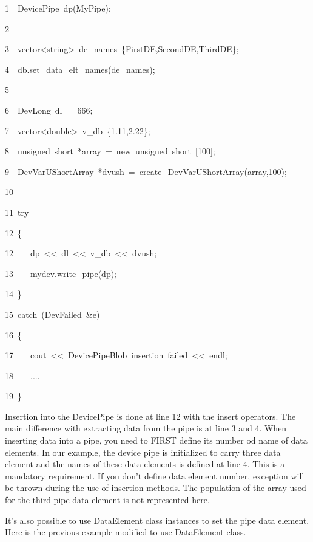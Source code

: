 
\begin{lyxcode}
1~~DevicePipe~dp(\textquotedbl{}MyPipe\textquotedbl{});

2~

3~~vector<string>~de\_names~\{\textquotedbl{}FirstDE\textquotedbl{},\textquotedbl{}SecondDE\textquotedbl{},\textquotedbl{}ThirdDE\textquotedbl{}\};

4~~db.set\_data\_elt\_names(de\_names);

5

6~~DevLong~dl~=~666;~~

7~~vector<double>~v\_db~\{1.11,2.22\};

8~~unsigned~short~{*}array~=~new~unsigned~short~{[}100{]};

9~~DevVarUShortArray~{*}dvush~=~create\_DevVarUShortArray(array,100);

10

11~try~~

12~\{~~~~~

12~~~~dp~<\textcompwordmark{}<~dl~<\textcompwordmark{}<~v\_db~<\textcompwordmark{}<~dvush;

13~~~~mydev.write\_pipe(dp);

14~\}

15~catch~(DevFailed~\&e)

16~\{~~~~~

17~~~~cout~<\textcompwordmark{}<~\textquotedbl{}DevicePipeBlob~insertion~failed\textquotedbl{}~<\textcompwordmark{}<~endl;~~~~~

18~~~~....~~

19~\}
\end{lyxcode}


Insertion into the DevicePipe is done at line 12 with the insert operators.
The main difference with extracting data from the pipe is at line
3 and 4. When inserting data into a pipe, you need to FIRST define
its number od name of data elements. In our example, the device pipe
is initialized to carry three data element and the names of these
data elements is defined at line 4. This is a mandatory requirement.
If you don't define data element number, exception will be thrown
during the use of insertion methods. The population of the array used
for the third pipe data element is not represented here.

It's also possible to use DataElement class instances to set the pipe
data element. Here is the previous example modified to use DataElement
class.

